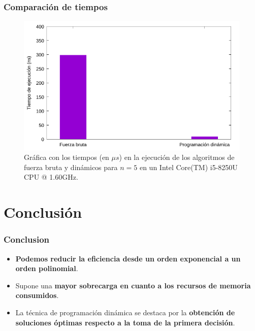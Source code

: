 \documentclass[13pt]{beamer}
\begin{document}
    \begin{frame}
		\frametitle{Comparación de tiempos}
		\begin{figure}[h]
            \centering
            \includegraphics[scale=0.7]{comparativa.pdf}
            \caption{Gráfica con los tiempos (en $\mu s$) en la ejecución de los algoritmos de fuerza bruta
            y dinámicos para $n=5$ en un Intel Core(TM) i5-8250U CPU @ 1.60GHz. }
            \label{graph:comp}
          \end{figure}
	\end{frame}
	
	\section{Conclusión}

    \begin{frame}
		\frametitle{Conclusion}
        \begin{itemize}
            
            \item \textbf{Podemos reducir la eficiencia desde un orden exponencial a un orden 
            polinomial}. 
            
            \item Supone una \textbf{mayor sobrecarga en cuanto 
            a los recursos de memoria consumidos}. 

            \item La técnica de programación
            dinámica se destaca por la \textbf{obtención de soluciones óptimas respecto a la toma de la primera decisión}.
            
            
        \end{itemize}
	\end{frame}
\end{document}
